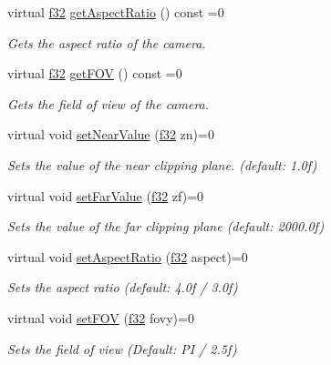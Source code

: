 \begin{DoxyCompactItemize}
virtual \hyperlink{namespaceirr_a0277be98d67dc26ff93b1a6a1d086b07}{f32} \hyperlink{classirr_1_1scene_1_1ICameraSceneNode_aed7af13bc5a076d61a10a1998f71742e}{get\+Aspect\+Ratio} () const =0
\begin{DoxyCompactList}\small\item\em Gets the aspect ratio of the camera. \end{DoxyCompactList}\item 
virtual \hyperlink{namespaceirr_a0277be98d67dc26ff93b1a6a1d086b07}{f32} \hyperlink{classirr_1_1scene_1_1ICameraSceneNode_a8396148b1c3e27e79a615a859ae7d75d}{get\+F\+OV} () const =0
\begin{DoxyCompactList}\small\item\em Gets the field of view of the camera. \end{DoxyCompactList}\item 
virtual void \hyperlink{classirr_1_1scene_1_1ICameraSceneNode_aab5107ae5d0373d6fb005a87741e7057}{set\+Near\+Value} (\hyperlink{namespaceirr_a0277be98d67dc26ff93b1a6a1d086b07}{f32} zn)=0
\begin{DoxyCompactList}\small\item\em Sets the value of the near clipping plane. (default\+: 1.\+0f) \end{DoxyCompactList}\item 
virtual void \hyperlink{classirr_1_1scene_1_1ICameraSceneNode_ab7e427dd639b6bb63f648d6d087da1ea}{set\+Far\+Value} (\hyperlink{namespaceirr_a0277be98d67dc26ff93b1a6a1d086b07}{f32} zf)=0
\begin{DoxyCompactList}\small\item\em Sets the value of the far clipping plane (default\+: 2000.\+0f) \end{DoxyCompactList}\item 
virtual void \hyperlink{classirr_1_1scene_1_1ICameraSceneNode_a5c3728a61a208376b9df6a701f4a5b3c}{set\+Aspect\+Ratio} (\hyperlink{namespaceirr_a0277be98d67dc26ff93b1a6a1d086b07}{f32} aspect)=0
\begin{DoxyCompactList}\small\item\em Sets the aspect ratio (default\+: 4.\+0f / 3.\+0f) \end{DoxyCompactList}\item 
virtual void \hyperlink{classirr_1_1scene_1_1ICameraSceneNode_a43ee11523e9cf842d4b5d8c6a572241c}{set\+F\+OV} (\hyperlink{namespaceirr_a0277be98d67dc26ff93b1a6a1d086b07}{f32} fovy)=0
\begin{DoxyCompactList}\small\item\em Sets the field of view (Default\+: PI / 2.\+5f) \end{DoxyCompactList}\item 

\end{DoxyCompactItemize}
